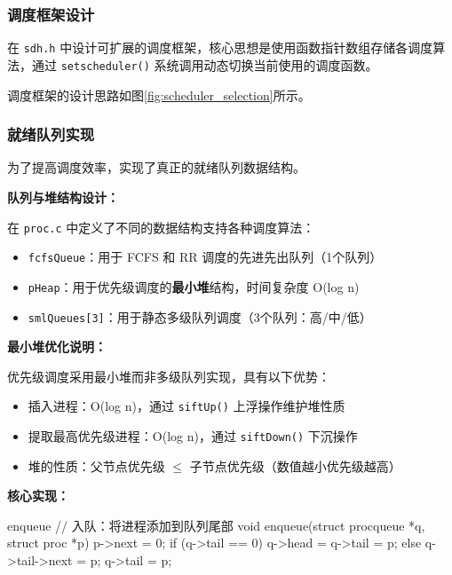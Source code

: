 \documentclass[a4paper, 12pt]{article}
\begin{document}
    \subsubsection{调度框架设计}
    在 \texttt{sdh.h} 中设计可扩展的调度框架，核心思想是使用函数指针数组存储各调度算法，通过 \texttt{setscheduler()} 系统调用动态切换当前使用的调度函数。
    
    调度框架的设计思路如图\ref{fig:scheduler_selection}所示。
    
    \subsubsection{就绪队列实现}
    
    为了提高调度效率，实现了真正的就绪队列数据结构。
    
    \textbf{队列与堆结构设计：}
    
    在 \texttt{proc.c} 中定义了不同的数据结构支持各种调度算法：
    \begin{itemize}
        \item \texttt{fcfsQueue}：用于 FCFS 和 RR 调度的先进先出队列（1个队列）
        \item \texttt{pHeap}：用于优先级调度的\textbf{最小堆}结构，时间复杂度 O(log n)
        \item \texttt{smlQueues[3]}：用于静态多级队列调度（3个队列：高/中/低）
    \end{itemize}
    
    \textbf{最小堆优化说明：}
    
    优先级调度采用最小堆而非多级队列实现，具有以下优势：
    \begin{itemize}
        \item 插入进程：O(log n)，通过 \texttt{siftUp()} 上浮操作维护堆性质
        \item 提取最高优先级进程：O(log n)，通过 \texttt{siftDown()} 下沉操作
        \item 堆的性质：父节点优先级 $\leq$ 子节点优先级（数值越小优先级越高）
    \end{itemize}
    
    \textbf{核心实现：}
    
    \begin{codeblock}{enqueue}
    // 入队：将进程添加到队列尾部
        void enqueue(struct procqueue *q, struct proc *p) {
        p->next = 0;
        if (q->tail == 0) {
            q->head = q->tail = p;
        } else {
            q->tail->next = p;
            q->tail = p;
        }
        }
    \end{codeblock}
    
\end{document}
